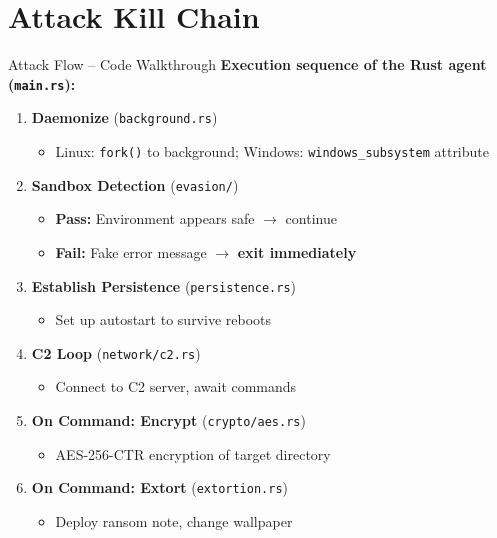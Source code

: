 \documentclass[aspectratio=169]{beamer}
\newcommand{\code}[1]{\texttt{\textcolor{primaryblue}{#1}}}
\begin{document}
\section{Attack Kill Chain}

\begin{frame}{Attack Flow -- Code Walkthrough}
  \textbf{Execution sequence of the Rust agent (\code{main.rs}):}

  \vspace{0.5em}
  \begin{enumerate}
    \item \textbf{Daemonize} (\code{background.rs})
    \begin{itemize}
      \item Linux: \code{fork()} to background; Windows: \code{windows\_subsystem} attribute
    \end{itemize}

    \item \textbf{Sandbox Detection} (\code{evasion/})
    \begin{itemize}
      \item \textbf{Pass:} Environment appears safe $\rightarrow$ continue
      \item \textbf{Fail:} Fake error message $\rightarrow$ \textbf{exit immediately}
    \end{itemize}

    \item \textbf{Establish Persistence} (\code{persistence.rs})
    \begin{itemize}
      \item Set up autostart to survive reboots
    \end{itemize}

    \item \textbf{C2 Loop} (\code{network/c2.rs})
    \begin{itemize}
      \item Connect to C2 server, await commands
    \end{itemize}

    \item \textbf{On Command: Encrypt} (\code{crypto/aes.rs})
    \begin{itemize}
      \item AES-256-CTR encryption of target directory
    \end{itemize}

    \item \textbf{On Command: Extort} (\code{extortion.rs})
    \begin{itemize}
      \item Deploy ransom note, change wallpaper
    \end{itemize}
  \end{enumerate}
\end{frame}
\end{document}
